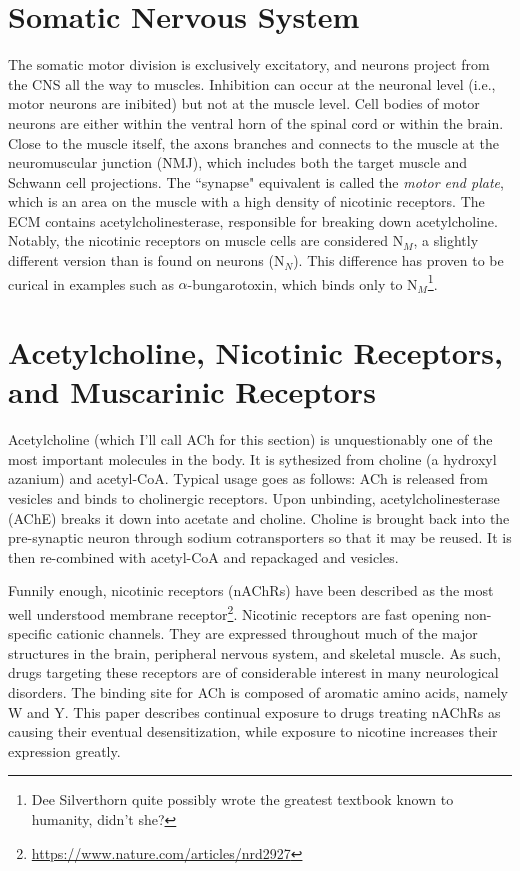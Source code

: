 \section{Somatic Nervous System}
The somatic motor division is exclusively excitatory, and neurons project from the CNS all the way to muscles. Inhibition can occur at the neuronal level (i.e., motor neurons are inibited) but not at the muscle level. Cell bodies of motor neurons are either within the ventral horn of the spinal cord or within the brain. Close to the muscle itself, the axons branches and connects to the muscle at the neuromuscular junction (NMJ), which includes both the target muscle and Schwann cell projections. The ``synapse" equivalent is called the \textit{motor end plate}, which is an area on the muscle with a high density of nicotinic receptors. The ECM contains acetylcholinesterase, responsible for breaking down acetylcholine. Notably, the nicotinic receptors on muscle cells are considered N$_M$, a slightly different version than is found on neurons (N$_N$). This difference has proven to be curical in examples such as $\alpha$-bungarotoxin, which binds only to N$_M$\footnote{Dee Silverthorn quite possibly wrote the greatest textbook known to humanity, didn't she?}.

\section{Acetylcholine, Nicotinic Receptors, and Muscarinic Receptors}

Acetylcholine (which I'll call ACh for this section) is unquestionably one of the most important molecules in the body. It is sythesized from choline (a hydroxyl azanium) and acetyl-CoA. Typical usage goes as follows: ACh is released from vesicles and binds to cholinergic receptors. Upon unbinding, acetylcholinesterase (AChE) breaks it down into acetate and choline. Choline is brought back into the pre-synaptic neuron through sodium cotransporters so that it may be reused. It is then re-combined with acetyl-CoA and repackaged and vesicles.\newline 

Funnily enough, nicotinic receptors (nAChRs) have been described as the most well understood membrane receptor\footnote{\url{https://www.nature.com/articles/nrd2927}}. Nicotinic receptors are fast opening non-specific cationic channels.  They are expressed throughout much of the major structures in the brain, peripheral nervous system, and skeletal muscle. As such, drugs targeting these receptors are of considerable interest in many neurological disorders. The binding site for ACh is composed of aromatic amino acids, namely W and Y. This paper describes continual exposure to drugs treating nAChRs as causing their eventual desensitization, while exposure to nicotine increases their expression greatly.\newline


